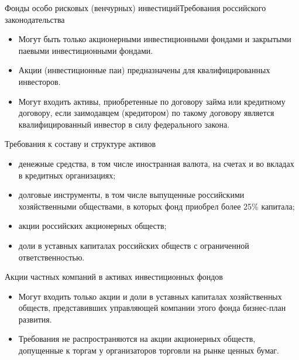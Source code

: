 \documentclass[_Venture_p1.tex]{subfiles}
\begin{document}
\begin{frame}[allowframebreaks]{Фонды особо рисковых (венчурных) инвестиций}{Требования российского законодательства}
\begin{itemize}
	\item Могут быть только акционерными инвестиционными фондами и закрытыми паевыми инвестиционными фондами. 
	\item Акции (инвестиционные паи) предназначены для квалифицированных инвесторов. 
	
	\pagebreak
	\item Могут входить активы, приобретенные по договору займа или кредитному договору, если заимодавцем (кредитором) по такому договору является квалифицированный инвестор в силу федерального закона.
\end{itemize}
\end{frame}

\begin{frame}[allowframebreaks]{Требования к составу и структуре активов}
\begin{itemize}
	\item денежные средства, в том числе иностранная валюта, на счетах и во вкладах в кредитных организациях;
	\item долговые инструменты, в том числе выпущенные российскими хозяйственными обществами, в которых фонд приобрел более 25\% капитала;
	
	\pagebreak
	\item акции российских акционерных обществ;
	\item доли в уставных капиталах российских обществ с ограниченной ответственностью.	
\end{itemize}
\end{frame}

\begin{frame}{\setfontsize{12pt}Акции частных компаний в активах инвестиционных фондов}
\begin{itemize}
	\item Могут входить только акции и доли в уставных капиталах хозяйственных обществ, представивших управляющей компании этого фонда бизнес-план развития. 
	\item Требования не распространяются на акции акционерных обществ, допущенные к торгам у организаторов торговли на рынке ценных бумаг.
\end{itemize}
\end{frame}
\end{document}
